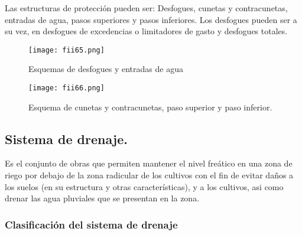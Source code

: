 Las estructuras de protección pueden ser: Desfogues, cunetas y contracunetas,
entradas de agua, pasos superiores y pasos inferiores. Los desfogues pueden ser a su
vez, en desfogues de excedencias o limitadores de gasto y desfogues totales.

\begin{figure}[h!]
	\centerline{\texttt{[image: fii65.png]}}
	\caption{Esquemas de desfogues y entradas de agua}
	\label{fii65}
\end{figure}

\begin{figure}[h!]
	\centerline{\texttt{[image: fii66.png]}}
	\caption{Esquema de cunetas y contracunetas, paso superior y paso inferior.}
	\label{fii66}
\end{figure}


\subsection{Sistema de drenaje.}

\begin{definition}
	Es el conjunto de obras que permiten mantener el nivel freático en una zona de
	riego por debajo de la zona radicular de los cultivos con el fin de evitar daños a los
	suelos (en su estructura y otras características), y a los cultivos, asi como drenar las
	agua pluviales que se presentan en la zona.
\end{definition}

\subsubsection{Clasificación del sistema de drenaje}

